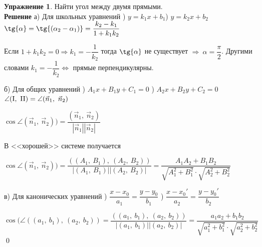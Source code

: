 \documentclass{article}
\theoremstyle{definition}
\newtheorem{exercise}{Упражнение}
\newenvironment{solution}[1]{\textbf{\\ Решение #1}}{\qed}
\newcommand{\RomanNumeralCaps}[1]
    {\MakeUppercase{\romannumeral #1}}
\begin{document}
\begin{exercise}
Найти угол между двумя прямыми.
\begin{solution}{}
а) Для школьных уравнений
) $y = k_1x + b_1$) $y = k_2x + b_2$\newline
$\tg{\alpha} = \tg{(\alpha_2 - \alpha_1)} = \dfrac{k_2 - k_1}{1 + k_1k_2}$

Если $1 + k_1k_2 = 0 \Longrightarrow k_1 = -\dfrac{1}{k_2}$ тогда $\tg{\alpha}$ не существует $\Longrightarrow\ \alpha = \dfrac{\pi}{2}$. Другими словами $k_1 = -\dfrac{1}{k_2} \Longleftrightarrow $ прямые перпендикулярны.

б) Для общих уравнений\newline
    \RomanNumeralCaps 1 ) $A_1x + B_1y + C_1 = 0$\newline
    \RomanNumeralCaps 2 ) $A_2x + B_2y + C_2 = 0$\newline
$\angle(\textrm{\RomanNumeralCaps 1},\ \textrm{\RomanNumeralCaps 2}) =  \angle(\vec n_1,\ \vec n_2)$

$\cos{\angle(\vec n_1,\ \vec n_2))} = \dfrac{(\vec n_1,\ \vec n_2)}{|\vec n_1||\vec n_2|}$

В <<хорошей>> системе получается

$\cos{\angle(\vec n_1,\ \vec n_2))} = \dfrac{\left(\left(A_1,\ B_1\right),\ \left(A_2,\ B_2\right)\right)}{|\left(A_1,\ B_1\right)| |\left(A_2,\ B_2\right)|} = \dfrac{A_1A_2 + B_1B_2}{\sqrt{A_1^2 + B_1^2}\cdot\sqrt{A_2^2 + B_2^2}}$

в) Для канонических уравнений\newline
    \RomanNumeralCaps 1 ) $\dfrac{x - x_0 }{a_1} = \dfrac{y - y_0 }{b_1}$\newline
    \RomanNumeralCaps 2 ) $\dfrac{x - x_0'}{a_2} = \dfrac{y - y_0'}{b_2}$\newline
    
$\cos(\angle((a_1,\ b_1),\ (a_2,\ b_2)) = \dfrac{\left((a_1,\ b_1),\ (a_2,\ b_2)\right)}{|(a_1,\ b_1)| |(a_2,\ b_2)|} = \dfrac{a_1a_2 + b_1b_2}{\sqrt{a_1^2 + b_1^2}\cdot\sqrt{a_2^2 + b_2^2}}$
\end{solution}
\end{exercise}
\end{document}
